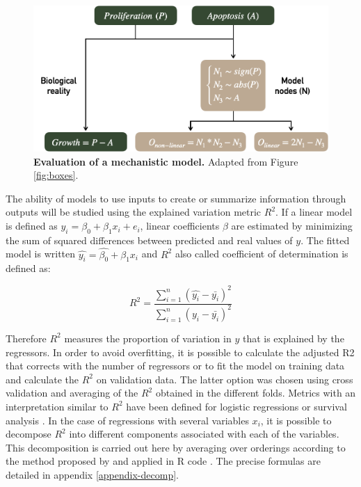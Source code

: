 \documentclass[a4paper,12pt,twoside,onecolumn,openright,final,oldfontcommands]{memoir}
\begin{document}
\begin{figure}

{\centering \includegraphics[width=0.8\linewidth]{fig/model-simulation} 

}

\caption[Definition of two distinct mechanistic models]{\textbf{Evaluation of a mechanistic model.}
Adapted from Figure \ref{fig:boxes}.}\label{fig:model-simulation}
\end{figure}







The ability of models to use inputs to create or summarize information
through outputs will be studied using the explained variation metric
\(R^2\). If a linear model is defined as \(y_i=\beta_0+\beta_1x_i+e_i\),
linear coefficients \(\beta\) are estimated by minimizing the sum of
squared differences between predicted and real values of \(y\). The
fitted model is written \(\hat{y_i}=\hat{\beta_0}+\hat{\beta_1}x_i\) and
\(R^2\) also called coefficient of determination is defined as:

\[R^2=\dfrac{\sum_{i=1}^{n} (\hat{y_i}-\bar{y_i})^2}{\sum_{i=1}^{n}  (y_i-\bar{y_i})^2}\]

Therefore \(R^2\) measures the proportion of variation in \(y\) that is
explained by the regressors. In order to avoid overfitting, it is
possible to calculate the adjusted R2 that corrects with the number of
regressors or to fit the model on training data and calculate the
\(R^2\) on validation data. The latter option was chosen using cross
validation and averaging of the \(R^2\) obtained in the different folds.
Metrics with an interpretation similar to \(R^2\) have been defined for
logistic regressions or survival analysis
\citep{choodari2012simulation}. In the case of regressions with several
variables \(x_i\), it is possible to decompose \(R^2\) into different
components associated with each of the variables. This decomposition is
carried out here by averaging over orderings according to the method
proposed by \citet{lindeman1980introduction} and applied in R code
\citep{gromping2006relative}. The precise formulas are detailed in
appendix \ref{appendix-decomp}.
\end{document}
